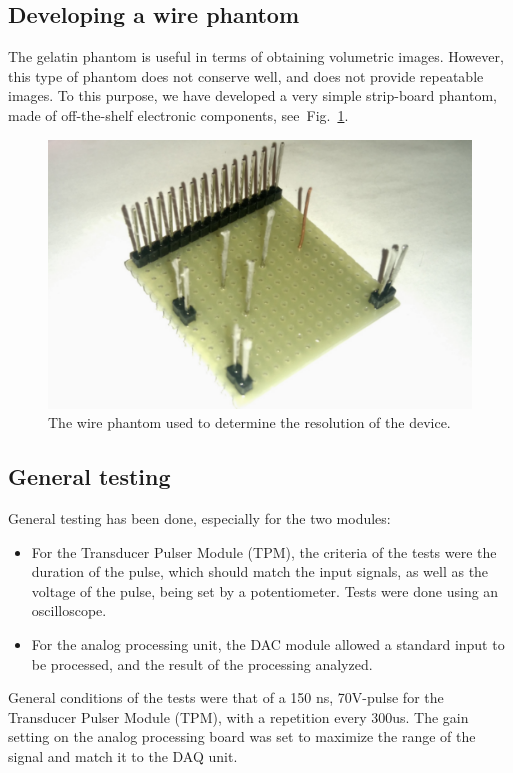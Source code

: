 \documentclass[letterpaper, 10 pt, conference]{ieeeconf} %
\begin{document}
\subsection{Developing a wire phantom}

The gelatin phantom is useful in terms of obtaining volumetric images. However, this type of phantom does not conserve well, and does not provide repeatable images. To this purpose, we have developed a very simple strip-board phantom, made of off-the-shelf electronic components, see~Fig.~\ref{fig:wirephantom}. 

\begin{figure}%
\centering
\includegraphics[width=.8\linewidth]{wirephantom}
\caption{The wire phantom used to determine the resolution of the device.}
\label{fig:wirephantom}
\end{figure}


\subsection{General testing}

General testing has been done, especially for the two modules:

\begin{itemize}
\item For the Transducer Pulser Module (TPM), the criteria of the tests were the duration of the pulse, which should match the input signals, as well as the voltage of the pulse, being set by a potentiometer. Tests were done using an oscilloscope.
\item For the analog processing unit, the DAC module allowed a standard input to be processed, and the result of the processing analyzed.
\end{itemize}

General conditions of the tests were that of a 150 ns, 70V-pulse for the Transducer Pulser Module (TPM), with a repetition every 300us. The gain setting on the analog processing board was set to maximize the range of the signal and match it to the DAQ unit.
\end{document}
